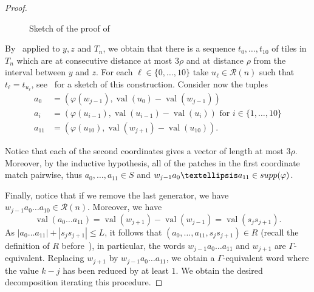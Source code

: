 \documentclass[10pt,a4paper]{amsart}
\newcommand{\supp}{\textnormal{supp}}
\newcommand{\val}{\operatorname{val}}
\begin{document}
\begin{proof}
\begin{figure}[h!]
\begin{tikzpicture}
        \end{tikzpicture}
        \caption{Sketch of the proof of~}
        \label{fig:proof_forma_canonica}
    \end{figure}
        
        By~ applied to $y,z$ and $T_n$, we obtain that there is a sequence $t_0,\dots,t_{10}$ of tiles in $T_n$ which are at consecutive distance at most $3\rho$ and at distance $\rho$ from the interval between $y$ and $z$. For each $\ell \in \{0,\dots,10\}$ take $u_{\ell}\in \mathcal{R}(n)$ such that $t_{\ell}=t_{u_{\ell}}$, see~ for a sketch of this construction. Consider now the tuples 
        \begin{align*}
            a_0 &  = (\varphi(w_{j-1}), \val(u_0) -\val(w_{j-1}))\\
            a_i & = (\varphi(u_{i-1}),\val(u_{i-1})-\val(u_i)) \mbox{ for } i \in \{1,\dots,10\}\\
            a_{11} & = (\varphi(u_{10}),\val(w_{j+1})-\val(u_{10})).
        \end{align*}

        Notice that each of the second coordinates gives a vector of length at most $3\rho$. Moreover, by the inductive hypothesis, all of the patches in the first coordinate match pairwise, thus $a_0,\dots,a_{11} \in S$ and  $w_{j-1}a_0\dots a_{11} \in \supp(\varphi)$.
        
        Finally, notice that if we remove the last generator, we have $w_{j-1}a_0\dots a_{10} \in \mathcal{R}(n)$. Moreover, we have \[\val(a_0\dots a_{11}) = \val(w_{j+1})-\val(w_{j-1}) =\val(s_js_{j+1}).\]
        As $|a_0\dots a_{11}| + |s_js_{j+1}|\leq L$, it follows that $(a_0,\dots, a_{11},s_js_{j+1}) \in R$ (recall the definition of $R$ before~), in particular, the words $w_{j-1}a_0\dots a_{11}$ and $w_{j+1}$ are $\Gamma$-equivalent. Replacing $w_{j+1}$ by $w_{j-1}a_0\dots a_{11}$, we obtain a $\Gamma$-equivalent word where the value $k-j$ has been reduced by at least $1$. We obtain the desired decomposition iterating this procedure.
    \end{proof}
\end{document}
